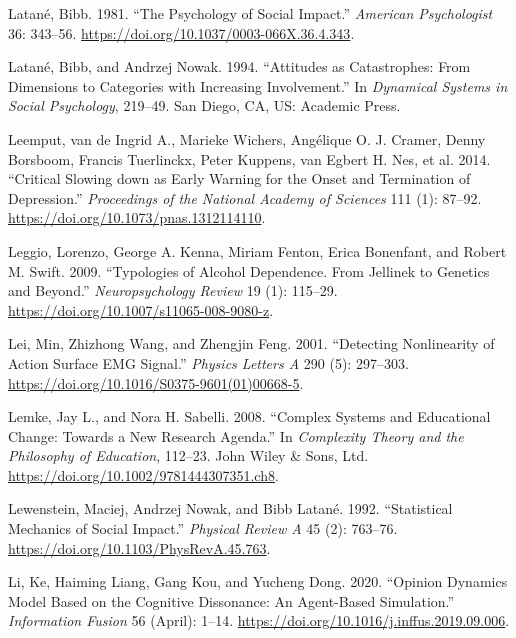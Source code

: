 \documentclass[
  a4paper,
  DIV=11,
  numbers=noendperiod,
  oneside]{scrreprt}
\newlength{\cslhangindent}
\newenvironment{CSLReferences}[2] %
 {\begin{list}{}{%
  \setlength{\itemindent}{0pt}
  \setlength{\leftmargin}{0pt}
  \setlength{\parsep}{0pt}
  \ifodd #1
   \setlength{\leftmargin}{\cslhangindent}
   \setlength{\itemindent}{-1\cslhangindent}
  \fi
  \setlength{\itemsep}{#2\baselineskip}}}
 {\end{list}}
\begin{document}
\begin{CSLReferences}{1}{0}
Latané, Bibb. 1981. {``The Psychology of Social Impact.''}
\emph{American Psychologist} 36: 343--56.
\url{https://doi.org/10.1037/0003-066X.36.4.343}.

Latané, Bibb, and Andrzej Nowak. 1994. {``Attitudes as Catastrophes:
{From} Dimensions to Categories with Increasing Involvement.''} In
\emph{Dynamical Systems in Social Psychology}, 219--49. {San Diego, CA,
US}: {Academic Press}.

Leemput, van de Ingrid A., Marieke Wichers, Angélique O. J. Cramer,
Denny Borsboom, Francis Tuerlinckx, Peter Kuppens, van Egbert H. Nes, et
al. 2014. {``Critical Slowing down as Early Warning for the Onset and
Termination of Depression.''} \emph{Proceedings of the National Academy
of Sciences} 111 (1): 87--92.
\url{https://doi.org/10.1073/pnas.1312114110}.

Leggio, Lorenzo, George A. Kenna, Miriam Fenton, Erica Bonenfant, and
Robert M. Swift. 2009. {``Typologies of {Alcohol Dependence}. {From
Jellinek} to {Genetics} and {Beyond}.''} \emph{Neuropsychology Review}
19 (1): 115--29. \url{https://doi.org/10.1007/s11065-008-9080-z}.

Lei, Min, Zhizhong Wang, and Zhengjin Feng. 2001. {``Detecting
Nonlinearity of Action Surface {EMG} Signal.''} \emph{Physics Letters A}
290 (5): 297--303. \url{https://doi.org/10.1016/S0375-9601(01)00668-5}.

Lemke, Jay L., and Nora H. Sabelli. 2008. {``Complex {Systems} and
{Educational Change}: {Towards} a {New Research Agenda}.''} In
\emph{Complexity {Theory} and the {Philosophy} of {Education}}, 112--23.
{John Wiley \& Sons, Ltd}.
\url{https://doi.org/10.1002/9781444307351.ch8}.

Lewenstein, Maciej, Andrzej Nowak, and Bibb Latané. 1992. {``Statistical
Mechanics of Social Impact.''} \emph{Physical Review A} 45 (2): 763--76.
\url{https://doi.org/10.1103/PhysRevA.45.763}.

Li, Ke, Haiming Liang, Gang Kou, and Yucheng Dong. 2020. {``Opinion
Dynamics Model Based on the Cognitive Dissonance: {An} Agent-Based
Simulation.''} \emph{Information Fusion} 56 (April): 1--14.
\url{https://doi.org/10.1016/j.inffus.2019.09.006}.


\end{CSLReferences}
\end{document}
